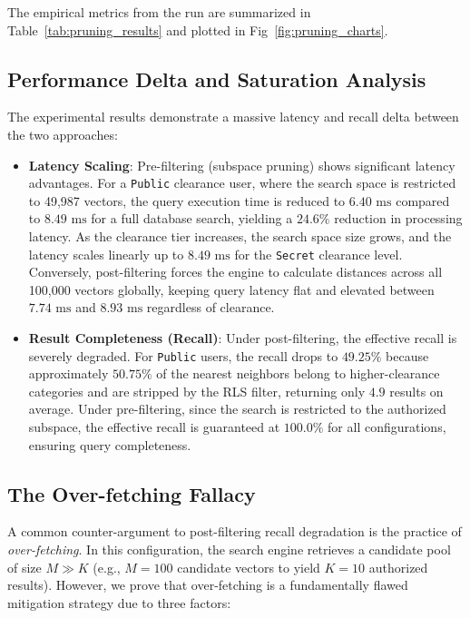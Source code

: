\documentclass[sigconf]{acmart}
\begin{document}
The empirical metrics from the run are summarized in Table~\ref{tab:pruning_results} and plotted in Fig~\ref{fig:pruning_charts}.

\subsection{Performance Delta and Saturation Analysis}
The experimental results demonstrate a massive latency and recall delta between the two approaches:
\begin{itemize}
    \item \textbf{Latency Scaling}: Pre-filtering (subspace pruning) shows significant latency advantages. For a \texttt{Public} clearance user, where the search space is restricted to 49,987 vectors, the query execution time is reduced to \textbf{$6.40\text{ ms}$} compared to \textbf{$8.49\text{ ms}$} for a full database search, yielding a \textbf{$24.6\%$} reduction in processing latency. As the clearance tier increases, the search space size grows, and the latency scales linearly up to $8.49\text{ ms}$ for the \texttt{Secret} clearance level. Conversely, post-filtering forces the engine to calculate distances across all 100,000 vectors globally, keeping query latency flat and elevated between $7.74\text{ ms}$ and $8.93\text{ ms}$ regardless of clearance.
    \item \textbf{Result Completeness (Recall)}: Under post-filtering, the effective recall is severely degraded. For \texttt{Public} users, the recall drops to \textbf{$49.25\%$} because approximately $50.75\%$ of the nearest neighbors belong to higher-clearance categories and are stripped by the RLS filter, returning only $4.9$ results on average. Under pre-filtering, since the search is restricted to the authorized subspace, the effective recall is guaranteed at \textbf{$100.0\%$} for all configurations, ensuring query completeness.
\end{itemize}

\subsection{The Over-fetching Fallacy}
A common counter-argument to post-filtering recall degradation is the practice of \textit{over-fetching}. In this configuration, the search engine retrieves a candidate pool of size $M \gg K$ (e.g., $M = 100$ candidate vectors to yield $K = 10$ authorized results). However, we prove that over-fetching is a fundamentally flawed mitigation strategy due to three factors:
\end{document}
